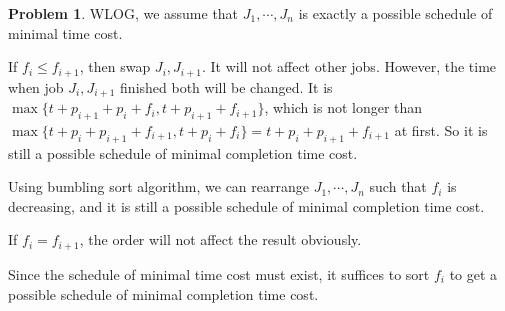 \documentclass[a4paper]{article}
\theoremstyle{definition}
\newtheorem{problem}{Problem}
\theoremstyle{plain}
\numberwithin{equation}{problem}
\begin{document}
\begin{problem}
  WLOG, we assume that  $ J_1,\cdots,J_n $  is exactly a possible schedule of minimal time cost.

  If  $ f_i  \leq  f_{i+1} $, then swap  $ J_i,J_{i+1} $. It will not affect other jobs. However, the time when job $ J_i,J_{i+1} $ finished both will be changed. It is   $ \max\{t+p_{i+1}+p_{i}+f_i,t+p_{i+1}+f_{i+1}\} $, which is not longer than  $ \max\{t+p_i+p_{i+1}+f_{i+1},t+p_i+f_i\}=t+p_i+p_{i+1}+f_{i+1} $ at first. So it is still  a possible schedule of minimal completion  time cost.
  
  Using bumbling sort algorithm, we can  rearrange  $ J_1,\cdots,J_n $ such that  $ f_i $ is decreasing, and it is still a possible schedule of minimal completion time cost.

  If  $ f_i=f_{i+1} $, the order will not affect the result obviously. 

  Since the schedule of minimal time cost must exist, it suffices to sort  $ f_i $ to get a possible schedule of minimal completion time cost. 
\end{problem}
\end{document}
